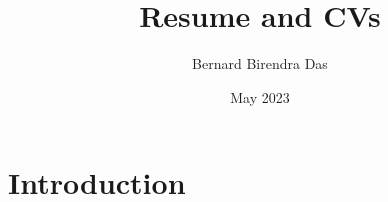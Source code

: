 \documentclass{article}
\title{Resume and CVs}
\author{Bernard Birendra Das}
\date{May 2023}
\begin{document}
\maketitle

\section{Introduction}
\end{document}
